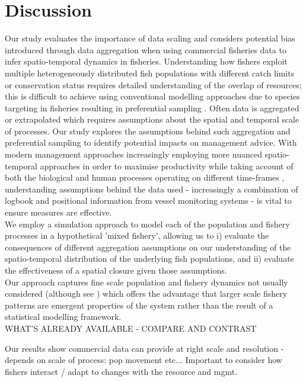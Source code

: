 \documentclass[review]{elsarticle}
\begin{document}
\section{Discussion}

Our study evaluates the importance of data scaling and considers potential bias
introduced through data aggregation when using commercial fisheries data to
infer spatio-temporal dynamics in fisheries. Understanding how fishers exploit
multiple heterogeneously distributed fish populations with different catch
limits or conservation status requires detailed understanding of the overlap of
resources; this is difficult to achieve using conventional modelling approaches
due to species targeting in fisheries resulting in preferential sampling
\citep{Martinez-Minaya2018}. Often data is aggregated or extrapolated which
requires assumptions about the spatial and temporal scale of processes. Our
study explores the assumptions behind such aggregation and preferential
sampling to identify potential impacts on management advice. With modern
management approaches increasingly employing more nuanced spatio-temporal
approaches in order to maximise productivity while taking account of both the
biological and human processes operating on different time-frames
\citep{Dunn2016}, understanding assumptions behind the data used -
increasingly a combination of logbook and positional information from vessel
monitoring systems - is vital to ensure measures are effective. \\

We employ a simulation approach to model each of the population and fishery
processes in a hypothetical 'mixed fishery', allowing us to i) evaluate the
consequences of different aggregation assumptions on our understanding of the
spatio-temporal distribution of the underlying fish populations, and ii)
evaluate the effectiveness of a spatial closure given those assumptions. \\

Our approach captures fine scale population and fishery dynamics not usually
considered (although see \cite{Bastardie2010, Bailey2018}) which offers the
advantage that larger scale fishery patterns are emergent properties of the
system rather than the result of a statistical modelling framework. \\

WHAT'S ALREADY AVAILABLE - COMPARE AND CONTRAST

Our results show commercial data can provide at right scale and resolution -
depends on scale of process: pop movement etc... Important to consider how
fishers interact / adapt to changes with the resource and mgmt. \\
\end{document}
